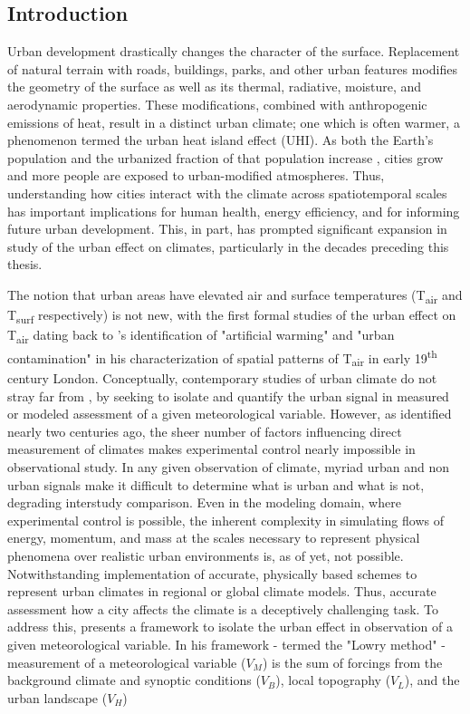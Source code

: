 \begin{bibunit}
	
\rhead{\thepage}

\chapter{Introduction}
Urban development drastically changes the character of the surface. Replacement of natural terrain with roads, buildings, parks, and other urban features modifies the geometry of the surface as well as its thermal, radiative, moisture, and aerodynamic properties. These modifications, combined with anthropogenic emissions of heat, result in a distinct urban climate; one which is often warmer, a phenomenon termed the urban heat island effect (UHI). As both the Earth's population and the urbanized fraction of that population increase \citep{Nations2014}, cities grow and more people are exposed to urban-modified atmospheres. Thus, understanding how cities interact with the climate across spatiotemporal scales has important implications for human health, energy efficiency, and for informing future urban development. This, in part, has prompted significant expansion in study of the urban effect on climates, particularly in the decades preceding this thesis. 

The notion that urban areas have elevated air and surface temperatures (T\textsubscript{air} and T\textsubscript{surf} respectively) is not new, with the first formal studies of the urban effect on T\textsubscript{air} dating back to \citet{Howard1833}'s identification of "artificial warming" and "urban contamination" in his characterization of spatial patterns of T\textsubscript{air} in early 19\textsuperscript{th} century London. Conceptually, contemporary studies of urban climate do not stray far from \citet{Howard1833}, by seeking to isolate and quantify the urban signal in measured or modeled assessment of a given meteorological variable. However, as \citet{Howard1833} identified nearly two centuries ago, the sheer number of factors influencing direct measurement of climates makes experimental control nearly impossible in observational study. In any given observation of climate, myriad urban and non urban signals make it difficult to determine what is urban and what is not, degrading interstudy comparison. Even in the modeling domain, where experimental control is possible, the inherent complexity in simulating flows of energy, momentum, and mass at the scales necessary to represent physical phenomena over realistic urban environments is, as of yet, not possible. Notwithstanding implementation of accurate, physically based schemes to represent urban climates in regional or global climate models. Thus, accurate assessment how a city affects the climate is a deceptively challenging task. To address this, \citet{Lowry1977} presents a framework to isolate the urban effect in observation of a given meteorological variable. In his framework - termed the "Lowry method" - measurement of a meteorological variable ($V_M$) is the sum of forcings from the background climate and synoptic conditions ($V_B$), local topography ($V_L$), and the urban landscape ($V_H$)


\end{bibunit}
